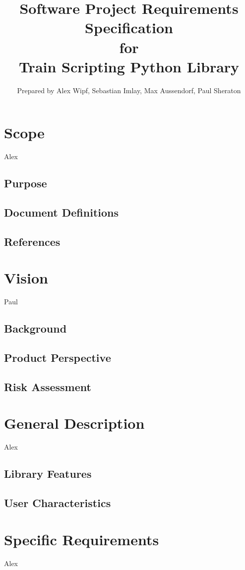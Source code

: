 \documentclass[a4paper,10pt,notitlepage]{article}
\title{{\bf Software Project Requirements Specification} \\ for \\ {\bf Train Scripting Python Library}}
\author{Prepared by Alex Wipf, Sebastian Imlay, Max Aussendorf, Paul Sheraton}
\begin{document}
\maketitle
\pagebreak

\tableofcontents

\section{Scope}
Alex
\subsection{Purpose}
\subsection{Document Definitions}
\subsection{References}

\section{Vision}
Paul
\subsection{Background}
\subsection{Product Perspective}
\subsection{Risk Assessment}

\section{General Description}
Alex
\subsection{Library Features}
\subsection{User Characteristics}

\section{Specific Requirements}
Alex
\end{document}
